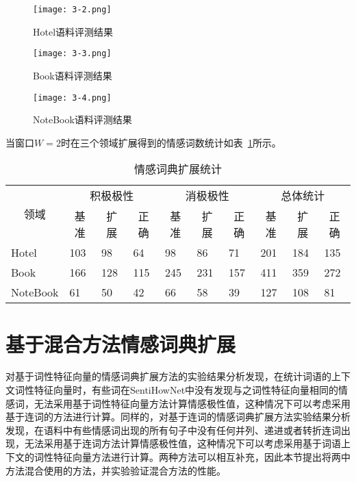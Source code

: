 \begin{figure}[htp]
\centering
\texttt{[image: 3-2.png]}
\caption{Hotel语料评测结果}
\label{fig3-2}
\end{figure}

\begin{figure}[htp]
\centering
\texttt{[image: 3-3.png]}
\caption{Book语料评测结果}
\label{fig3-3}
\end{figure}

\begin{figure}[htp]
\centering
\texttt{[image: 3-4.png]}
\caption{NoteBook语料评测结果}
\label{fig3-4}
\end{figure}

当窗口$W=2$时在三个领域扩展得到的情感词数统计如表~\ref{tab3-2-3}所示。
\begin{table}[htp]
\centering
\caption{情感词典扩展统计}
\label{tab3-2-3}
\begin{tabular}{|l|l|l|l|l|l|l|l|l|l|}
\hline
\multicolumn{1}{|c|}{\multirow{2}{*}{领域}} & \multicolumn{3}{c|}{积极极性} & \multicolumn{3}{c|}{消极极性} & \multicolumn{3}{c|}{总体统计} \\ \cline{2-10} 
\multicolumn{1}{|c|}{} & \multicolumn{1}{c|}{基准} & \multicolumn{1}{c|}{扩展} & \multicolumn{1}{c|}{正确} & \multicolumn{1}{c|}{基准} & \multicolumn{1}{c|}{扩展} & \multicolumn{1}{c|}{正确} & \multicolumn{1}{c|}{基准} & \multicolumn{1}{c|}{扩展} & \multicolumn{1}{c|}{正确} \\ \hline
Hotel & 103 & 98 & 64 & 98 & 86 & 71 & 201 & 184 & 135 \\ \hline
Book & 166 & 128 & 115 & 245 & 231 & 157 & 411 & 359 & 272 \\ \hline
NoteBook & 61 & 50 & 42 & 66 & 58 & 39 & 127 & 108 & 81 \\ \hline
\end{tabular}
\end{table}

\section{基于混合方法情感词典扩展}
对基于词性特征向量的情感词典扩展方法的实验结果分析发现，在统计词语的上下文词性特征向量时，有些词在SentiHowNet中没有发现与之词性特征向量相同的情感词，无法采用基于词性特征向量方法计算情感极性值，这种情况下可以考虑采用基于连词的方法进行计算。同样的，对基于连词的情感词典扩展方法实验结果分析发现，在语料中有些情感词出现的所有句子中没有任何并列、递进或者转折连词出现，无法采用基于连词方法计算情感极性值，这种情况下可以考虑采用基于词语上下文的词性特征向量方法进行计算。两种方法可以相互补充，因此本节提出将两中方法混合使用的方法，并实验验证混合方法的性能。

